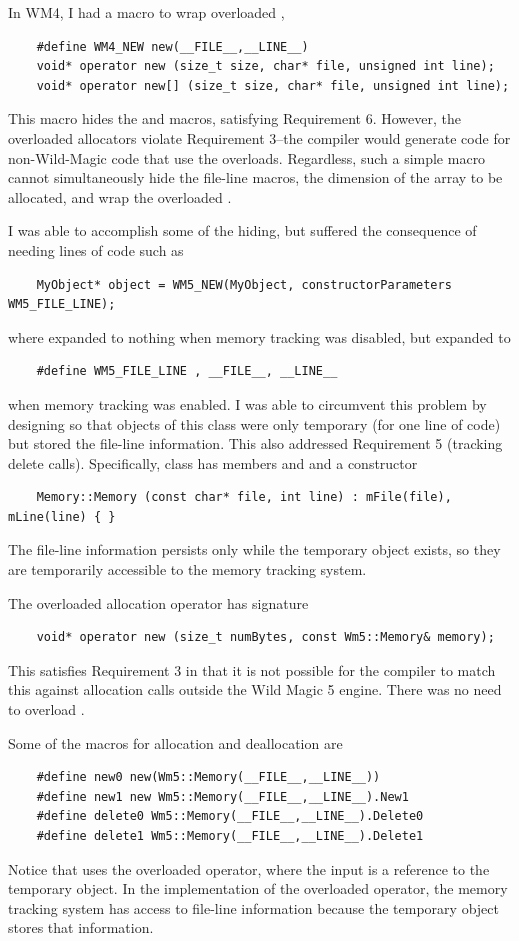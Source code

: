 \documentclass{article}
\begin{document}
In WM4, I had a macro to wrap overloaded ,
\begin{verbatim}
    #define WM4_NEW new(__FILE__,__LINE__)
    void* operator new (size_t size, char* file, unsigned int line);
    void* operator new[] (size_t size, char* file, unsigned int line);
\end{verbatim}
This macro hides the  and  macros,
satisfying Requirement 6.  However, the overloaded allocators violate
Requirement 3--the compiler would generate code for non-Wild-Magic code
that use the overloads.  Regardless, such a simple macro cannot simultaneously
hide the file-line macros, the dimension of the array to be allocated, and
wrap the overloaded .

I was able to accomplish some of the hiding, but suffered the consequence of
needing lines of code such as
\begin{verbatim}
    MyObject* object = WM5_NEW(MyObject, constructorParameters WM5_FILE_LINE);
\end{verbatim}
where  expanded to nothing when memory tracking was
disabled, but expanded to
\begin{verbatim}
    #define WM5_FILE_LINE , __FILE__, __LINE__
\end{verbatim}
when memory tracking was enabled.  I was able to circumvent this problem by
designing  so that objects of this class were only temporary
(for one line of code) but stored the file-line information.  This also
addressed Requirement 5 (tracking delete calls).  Specifically, class
 has members  and  and a constructor
\begin{verbatim}
    Memory::Memory (const char* file, int line) : mFile(file), mLine(line) { }
\end{verbatim}
The file-line information persists only while the temporary object exists, so
they are temporarily accessible to the memory tracking system.

The overloaded allocation operator has signature
\begin{verbatim}
    void* operator new (size_t numBytes, const Wm5::Memory& memory);
\end{verbatim}
This satisfies Requirement 3 in that it is not possible for the compiler to
match this against allocation calls outside the Wild Magic 5 engine.  There
was no need to overload .

Some of the macros for allocation and deallocation are
\begin{verbatim}
    #define new0 new(Wm5::Memory(__FILE__,__LINE__))
    #define new1 new Wm5::Memory(__FILE__,__LINE__).New1
    #define delete0 Wm5::Memory(__FILE__,__LINE__).Delete0
    #define delete1 Wm5::Memory(__FILE__,__LINE__).Delete1
\end{verbatim}
Notice that  uses the overloaded  operator, where the
input  is a reference to the temporary  object.
In the implementation of the overloaded  operator, the memory
tracking system has access to file-line information because the temporary
object stores that information.
\end{document}
